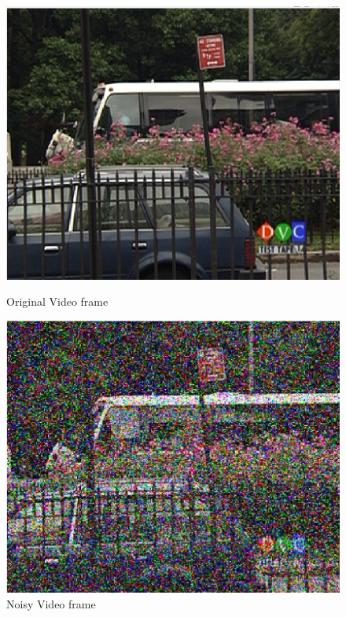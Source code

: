\documentclass{article}
\begin{document}
\begin{figure}[H]
    \centering
    \begin{minipage}{.45\textwidth}
        \centering
        \includegraphics[width=\linewidth]{Images/Bus_original.png}
        \caption{Original Video frame}
        \label{fig:totalpowervst}
    \end{minipage}
    \begin{minipage}{.45\textwidth}
        \centering
        \includegraphics[width=\linewidth]{Images/Bus_1_noisy.png}
        \caption{Noisy Video frame}
    \end{minipage}
\end{figure}
\end{document}

